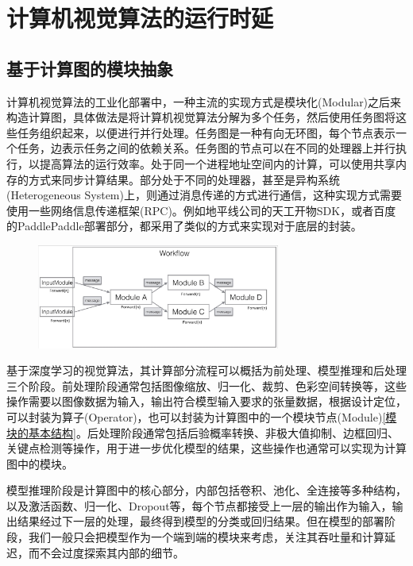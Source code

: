 \documentclass[master]{shtthesis}
\begin{document}
\section{计算机视觉算法的运行时延}\label{计算机视觉算法的运行时延}

\subsection{基于计算图的模块抽象}\label{基于计算图的模块抽象}
计算机视觉算法的工业化部署中，一种主流的实现方式是模块化(Modular)之后来构造计算图，具体做法是将计算机视觉算法分解为多个任务\cite{arora1998thread}，然后使用任务图将这些任务组织起来，以便进行并行处理。任务图是一种有向无环图，每个节点表示一个任务，边表示任务之间的依赖关系。任务图的节点可以在不同的处理器上并行执行，以提高算法的运行效率。处于同一个进程地址空间内的计算，可以使用共享内存的方式来同步计算结果\cite{augonnet2009starpu}。部分处于不同的处理器，甚至是异构系统(Heterogeneous System)上，则通过消息传递的方式进行通信，这种实现方式需要使用一些网络信息传递框架(RPC)。例如地平线公司的天工开物SDK，或者百度的PaddlePaddle\cite{ma2019paddlepaddle}部署部分，都采用了类似的方式来实现对于底层的封装。

\begin{figure}[htbp]
	\centering
	\includegraphics[width=8cm]{img/workflow.png}
	\label{基于模块构造工作流}
\end{figure}

基于深度学习的视觉算法，其计算部分流程可以概括为前处理、模型推理和后处理三个阶段。前处理阶段通常包括图像缩放、归一化、裁剪、色彩空间转换等，这些操作需要以图像数据为输入，输出符合模型输入要求的张量数据，根据设计定位，可以封装为算子(Operator)，也可以封装为计算图中的一个模块节点(Module)\ref{模块的基本结构}。后处理阶段通常包括后验概率转换、非极大值抑制、边框回归、关键点检测等操作，用于进一步优化模型的结果，这些操作也通常可以实现为计算图中的模块。

模型推理阶段是计算图中的核心部分，内部包括卷积、池化、全连接等多种结构，以及激活函数、归一化、Dropout\cite{srivastava2014dropout}等，每个节点都接受上一层的输出作为输入，输出结果经过下一层的处理，最终得到模型的分类或回归结果。但在模型的部署阶段，我们一般只会把模型作为一个端到端的模块来考虑，关注其吞吐量和计算延迟，而不会过度探索其内部的细节。
\end{document}
